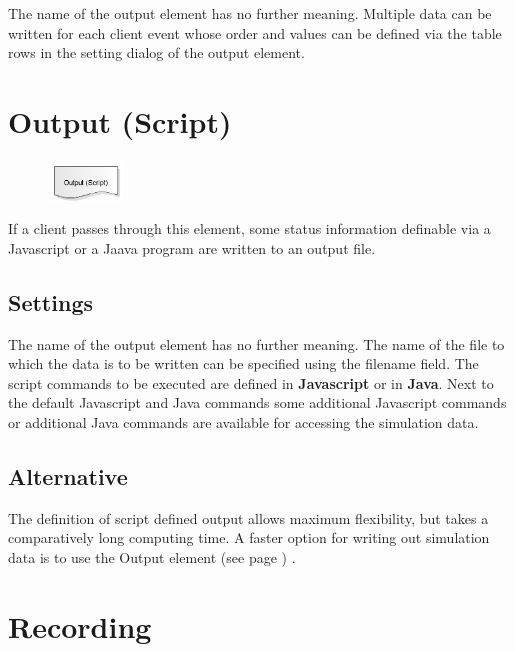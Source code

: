 The name of the output element has no further meaning. Multiple data can be written for each client event whose order and
values can be defined via the table rows in the setting dialog of the output element.


\section{Output (Script)}
\label{ref:ModelElementOutputJS}

\begin{figure}
\vspace{-22pt}
\includegraphics[width=2cm]{imageModelElementOutputJS.png}
\vspace{-22pt}
\end{figure}

If a client passes through this element, some status information definable via
a Javascript or a Jaava program are written to an output file.

\subsection*{Settings}

The name of the output element has no further meaning. The name of the file to which the data is to be written
can be specified using the filename field. The script commands to be executed are defined in \textbf{Javascript}
or in \textbf{Java}. Next to the default Javascript and Java commands some
additional Javascript commands or additional Java commands 
are available for accessing the simulation data.

\subsection*{Alternative}

The definition of script defined output allows maximum flexibility, but takes a comparatively long
computing time. A faster option for writing out simulation data is to use the
Output element (see page \pageref{ref:ModelElementOutput}) .


\section{Recording}
\label{ref:ModelElementRecord}


